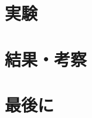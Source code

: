 \documentclass[11pt,a4paper]{jsarticle}
\theoremstyle{definition}
\begin{document}
\section{実験}

\section{結果・考察}

\section{最後に}

\begin{comment} \begin{equation}
  \begin{split}
    a
  \end{split}
\end{equation}

\mathcal{L}(X,Y)
点列$(A_n)$
\\
&
\end{comment}


\end{document}
